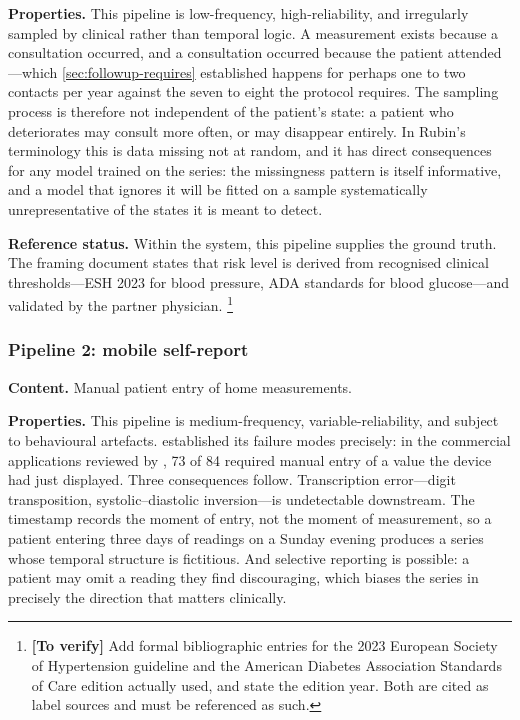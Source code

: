 \documentclass[12pt,a4paper,oneside]{report}
\newcommand{\verify}[1]{\footnote{\textbf{[To verify]} #1}}
\begin{document}
\textbf{Properties.} This pipeline is low-frequency, high-reliability, and irregularly sampled by clinical rather than temporal logic. A measurement exists because a consultation occurred, and a consultation occurred because the patient attended---which \cref{sec:followup-requires} established happens for perhaps one to two contacts per year against the seven to eight the protocol requires. The sampling process is therefore not independent of the patient's state: a patient who deteriorates may consult more often, or may disappear entirely. In Rubin's terminology this is data missing not at random, and it has direct consequences for any model trained on the series: the missingness pattern is itself informative, and a model that ignores it will be fitted on a sample systematically unrepresentative of the states it is meant to detect.

\textbf{Reference status.} Within the system, this pipeline supplies the ground truth. The framing document states that risk level is derived from recognised clinical thresholds---ESH 2023 for blood pressure, ADA standards for blood glucose---and validated by the partner physician.%
\verify{Add formal bibliographic entries for the 2023 European Society of Hypertension guideline and the American Diabetes Association Standards of Care edition actually used, and state the edition year. Both are cited as label sources and must be referenced as such.}

\subsubsection{Pipeline 2: mobile self-report}

\textbf{Content.} Manual patient entry of home measurements.

\textbf{Properties.} This pipeline is medium-frequency, variable-reliability, and subject to behavioural artefacts.  established its failure modes precisely: in the commercial applications reviewed by \textcite{alessa2019}, 73 of 84 required manual entry of a value the device had just displayed. Three consequences follow. Transcription error---digit transposition, systolic--diastolic inversion---is undetectable downstream. The timestamp records the moment of entry, not the moment of measurement, so a patient entering three days of readings on a Sunday evening produces a series whose temporal structure is fictitious. And selective reporting is possible: a patient may omit a reading they find discouraging, which biases the series in precisely the direction that matters clinically.
\end{document}
